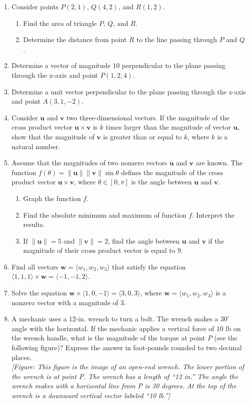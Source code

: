 \documentclass{exercises}
\begin{document}
\begin{enumerate}[resume]
\item Consider points $P(2,1)$, $Q(4,2)$, and $R(1,2)$.
\begin{enumerate}[label=(\alph*)]
  \item Find the area of triangle $P$, $Q$, and $R$.
  \item Determine the distance from point $R$ to the line passing through $P$ and $Q$.
\end{enumerate}
\item Determine a vector of magnitude $10$ perpendicular to the plane passing through the x-axis and point $P(1,2,4)$.
\item Determine a unit vector perpendicular to the plane passing through the z-axis and point $A(3,1,-2)$.
\item Consider $\mathbf{u}$ and $\mathbf{v}$ two three-dimensional vectors. If the magnitude of the cross product vector $\mathbf{u}\times \mathbf{v}$ is $k$ times larger than the magnitude of vector $\mathbf{u}$, show that the magnitude of $\mathbf{v}$ is greater than or equal to $k$, where $k$ is a natural number.
\item \techrequired Assume that the magnitudes of two nonzero vectors $\mathbf{u}$ and $\mathbf{v}$ are known. The function $f(\theta)=\|\mathbf{u}\|\|\mathbf{v}\|\sin \theta$ defines the magnitude of the cross product vector $\mathbf{u}\times \mathbf{v}$, where $\theta \in[0,\pi]$ is the angle between $\mathbf{u}$ and $\mathbf{v}$.
\begin{enumerate}[label=(\alph*)]
  \item Graph the function $f$.
  \item Find the absolute minimum and maximum of function $f$. Interpret the results.
  \item If $\|\mathbf{u}\|=5$ and $\|\mathbf{v}\|=2$, find the angle between $\mathbf{u}$ and $\mathbf{v}$ if the magnitude of their cross product vector is equal to $9$.
\end{enumerate}
\item Find all vectors $\mathbf{w}=\langle w_{1},w_{2},w_{3}\rangle$ that satisfy the equation $\langle1,1,1\rangle \times \mathbf{w}=\langle-1,-1,2\rangle$.
\item Solve the equation $\mathbf{w}\times \langle1,0,-1\rangle=\langle3,0,3\rangle$, where $\mathbf{w}=\langle w_{1},w_{2},w_{3}\rangle$ is a nonzero vector with a magnitude of $3$.
\item \techrequired A mechanic uses a 12-in. wrench to turn a bolt. The wrench makes a $30^\circ$ angle with the horizontal. If the mechanic applies a vertical force of $10$ lb on the wrench handle, what is the magnitude of the torque at point $P$ (see the following figure)? Express the answer in foot-pounds rounded to two decimal places. \\ \textit{[Figure: This figure is the image of an open-end wrench. The lower portion of the wrench is at point P. The wrench has a length of ``12 in.'' The angle the wrench makes with a horizontal line from P is 30 degrees. At the top of the wrench is a downward vertical vector labeled ``10 lb.'']}

\end{enumerate}
\end{document}
